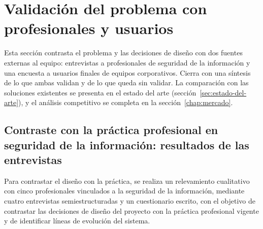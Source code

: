 \chapter{Validación del problema con profesionales y usuarios}\label{chap:validacion}

Esta sección contrasta el problema y las decisiones de diseño con dos fuentes externas al equipo: entrevistas a profesionales de seguridad de la información y una encuesta a usuarios finales de equipos corporativos. Cierra con una síntesis de lo que ambas validan y de lo que queda sin validar. La comparación con las soluciones existentes se presenta en el estado del arte (sección~\ref{sec:estado-del-arte}), y el análisis competitivo se completa en la sección~\ref{chap:mercado}.

\section{Contraste con la práctica profesional en seguridad de la información: resultados de las entrevistas}
\label{sec:entrevistas-profesionales}

Para contrastar el diseño con la práctica, se realiza un relevamiento cualitativo
 con cinco profesionales vinculados a la seguridad de la información, mediante cuatro entrevistas semiestructuradas y un cuestionario escrito, con el objetivo de contrastar las decisiones de diseño del proyecto con la práctica profesional vigente y de identificar líneas de evolución del sistema.

